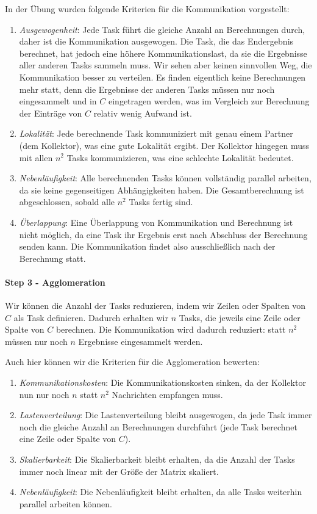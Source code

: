 In der Übung wurden folgende Kriterien für die Kommunikation vorgestellt:
\begin{enumerate}
    \item{\textit{Ausgewogenheit}}: Jede Task führt die gleiche Anzahl an Berechnungen durch, daher ist die Kommunikation ausgewogen.
        Die Task, die das Endergebnis berechnet, hat jedoch eine höhere Kommunikationslast, da sie die Ergebnisse aller anderen Tasks sammeln muss.
        Wir sehen aber keinen sinnvollen Weg, die Kommunikation besser zu verteilen. Es finden eigentlich keine Berechnungen mehr statt,
        denn die Ergebnisse der anderen Tasks müssen nur noch eingesammelt und in $C$ eingetragen werden, was im Vergleich zur Berechnung der Einträge
        von $C$ relativ wenig Aufwand ist.
    \item{\textit{Lokalität}}: Jede berechnende Task kommuniziert mit genau einem Partner (dem Kollektor), was eine gute Lokalität ergibt. Der Kollektor hingegen muss mit allen $n^2$ Tasks kommunizieren, was eine schlechte Lokalität bedeutet.
    \item{\textit{Nebenläufigkeit}}: Alle berechnenden Tasks können vollständig parallel arbeiten, da sie keine gegenseitigen Abhängigkeiten haben. Die Gesamtberechnung ist abgeschlossen, sobald alle $n^2$ Tasks fertig sind.
    \item{\textit{Überlappung}}: Eine Überlappung von Kommunikation und Berechnung ist nicht möglich, da eine Task ihr Ergebnis erst nach Abschluss der Berechnung senden kann. Die Kommunikation findet also ausschließlich nach der Berechnung statt.
\end{enumerate}

\paragraph{Step 3 - Agglomeration} Wir können die Anzahl der Tasks reduzieren, indem wir Zeilen oder Spalten von $C$ als Task definieren. Dadurch erhalten wir $n$ Tasks, die jeweils eine Zeile oder Spalte von $C$ berechnen. 
Die Kommunikation wird dadurch reduziert: statt $n^2$ müssen nur noch $n$ Ergebnisse eingesammelt werden.

Auch hier können wir die Kriterien für die Agglomeration bewerten:
\begin{enumerate}
    \item{\textit{Kommunikationskosten}}: Die Kommunikationskosten sinken, da der Kollektor nun nur noch $n$ statt $n^2$ Nachrichten empfangen muss.
    \item{\textit{Lastenverteilung}}: Die Lastenverteilung bleibt ausgewogen, da jede Task immer noch die gleiche Anzahl an Berechnungen durchführt (jede Task berechnet eine Zeile oder Spalte von $C$).
    \item{\textit{Skalierbarkeit}}: Die Skalierbarkeit bleibt erhalten, da die Anzahl der Tasks immer noch linear mit der Größe der Matrix skaliert. 
    \item{\textit{Nebenläufigkeit}}: Die Nebenläufigkeit bleibt erhalten, da alle Tasks weiterhin parallel arbeiten können.
\end{enumerate}

